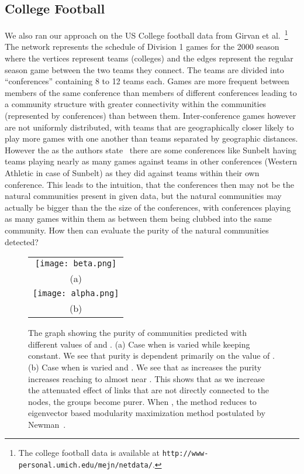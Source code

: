 \documentclass{sig-alternate}
\begin{document}
\subsection{College Football}

We also ran our approach on the US College football data from Girvan et al.~\cite{GirvanNewman02}\footnote{The college football data is available at \texttt{http://www-personal.umich.edu/mejn/netdata/}.} The network represents the schedule of Division 1 games for the 2000 season where the vertices represent teams (colleges) and the edges represent the regular season game between the two teams they connect. The teams are divided into ``conferences'' containing 8 to 12 teams each. Games are more frequent between members of the same conference than members of different conferences leading to a  community structure with greater connectivity within the communities (represented by conferences) than between them. Inter-conference games however are not uniformly distributed, with teams that are geographically closer likely to play more games with one another than teams separated by geographic distances. However the as the authors state~\cite{GirvanNewman02} there are some conferences  like Sunbelt having teams playing nearly as many games against teams in other conferences (Western Athletic in case of Sunbelt) as they did against teams within their own conference. This leads to the intuition, that the conferences then may not be the natural communities present in given data, but the natural communities may actually be bigger than the the size of the conferences, with conferences playing as many games within them as between them being clubbed into the same community. How then can evaluate the purity of the natural communities detected?


 \begin{figure}[tbhp]
 \begin{tabular}{c}
   \texttt{[image: beta.png]}  \\
   (a)\\
   \texttt{[image: alpha.png]} \\
   (b)
 \end{tabular}
 \caption{The graph showing the purity of communities predicted  with different values of  and . (a) Case when  is varied while keeping  constant. We see that purity is dependent primarily on the value of .
 (b) Case when  is varied and . We see that as  increases the purity increases reaching to almost  near . This shows that as we increase the attenuated effect of links that are not directly connected to the nodes, the groups become purer. When , the method reduces to  eigenvector based modularity maximization method postulated by Newman~\protect\cite{Newman206}.}
 \label{fig:football}
 \end{figure}
\end{document}
